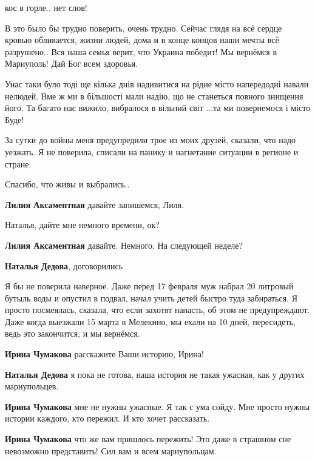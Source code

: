 
кос в горле.. нет слов!


В это было бы трудно поверить, очень трудно. Сейчас глядя на всё сердце кровью
обливается, жизни людей, дома и в конце концов наши мечты всё разрушено.. Вся наша
семья верит, что Украина победит! Мы вернёмся в Мариуполь! Дай Бог всем
здоровья.


Унас таки було тоді ще кілька днів надивитися на рідне місто напередодні навали
нелюдей. Вме ж ми в більшості мали надію, що не станеться повного знищення його.
Та багато нас вижило, вибралося в вільний світ ...та ми повернемося і місто
Буде!


За сутки до войны меня предупредили трое из моих друзей, сказали, что надо
уезжать. Я не поверила, списали на панику и нагнетание ситуации в регионе и
стране.

Спасибо, что живы и выбрались..

\begin{itemize} %
\textbf{Лилия Аксаментная} давайте запишемся, Лиля.

Наталья, дайте мне немного времени, ок?

\textbf{Лилия Аксаментная} давайте. Немного. На следующей неделе? 🙏

\textbf{Наталья Дедова}, договорились
\end{itemize} %


Я бы не поверила наверное. Даже перед 17 февраля муж набрал 20 литровый бутыль
воды и опустил в подвал, начал учить детей быстро туда забираться. Я просто
посмеялась, сказала, что если захотят напасть, об этом не предупреждают. Даже
когда выезжали 15 марта в Мелекино, мы ехали на 10 дней, пересидеть, ведь это
закончится, и мы вернёмся.

\begin{itemize} %
\textbf{Ирина Чумакова} расскажите Ваши историю, Ирина! 🙏

\textbf{Наталья Дедова} я пока не готова, наша история не такая ужасная, как у других мариупольцев.

\textbf{Ирина Чумакова} мне не нужны ужасные. Я так с ума сойду. Мне просто нужны истории каждого, кто пережил. И кто хочет рассказать.

\textbf{Ирина Чумакова} что же вам пришлось пережить! Это даже в страшном сне невозможно представить! Сил вам и всем мариупольцам.
\end{itemize} %

